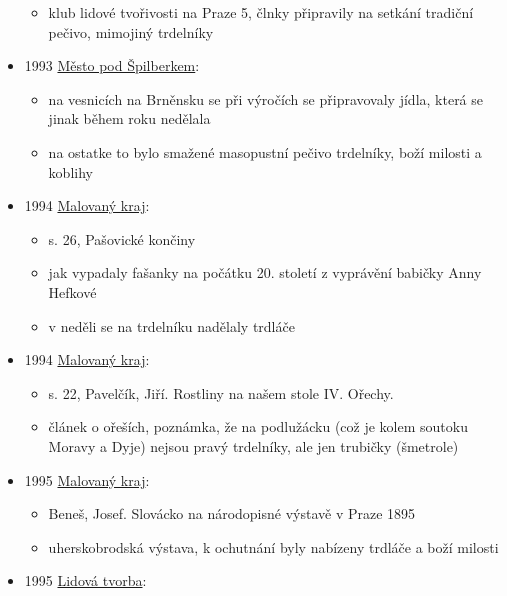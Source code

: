 \begin{itemize}
  \begin{itemize}
  \tightlist
  \item
    klub lidové tvořivosti na Praze 5, člnky připravily na setkání
    tradiční pečivo, mimojiný trdelníky
  \end{itemize}
\item
  1993
  \href{https://ceskadigitalniknihovna.cz/uuid/uuid:f9f63a60-98ab-11e3-8e84-005056827e51}{Město
  pod Špilberkem}:

  \begin{itemize}
  \tightlist
  \item
    na vesnicích na Brněnsku se při výročích se připravovaly jídla,
    která se jinak během roku nedělala
  \item
    na ostatke to bylo smažené masopustní pečivo trdelníky, boží milosti
    a koblihy
  \end{itemize}
\item
  1994
  \href{https://ceskadigitalniknihovna.cz/uuid/uuid:1e8fe7c0-21a7-11e4-a8ab-001018b5eb5c}{Malovaný
  kraj}:

  \begin{itemize}
  \tightlist
  \item
    s. 26, Pašovické končiny
  \item
    jak vypadaly fašanky na počátku 20. století z vyprávění babičky Anny
    Hefkové
  \item
    v neděli se na trdelníku nadělaly trdláče
  \end{itemize}
\item
  1994
  \href{https://ceskadigitalniknihovna.cz/uuid/uuid:464cbdb0-4060-11e4-8f33-5ef3fc9ae867}{Malovaný
  kraj}:

  \begin{itemize}
  \tightlist
  \item
    s. 22, Pavelčík, Jiří. Rostliny na našem stole IV. Ořechy.
  \item
    článek o ořeších, poznámka, že na podlužácku (což je kolem soutoku
    Moravy a Dyje) nejsou pravý trdelníky, ale jen trubičky (šmetrole)
  \end{itemize}
\item
  1995
  \href{https://ceskadigitalniknihovna.cz/uuid/uuid:0f104c60-3fbe-11e4-b6b9-001018b5eb5c}{Malovaný
  kraj}:

  \begin{itemize}
  \tightlist
  \item
    Beneš, Josef. Slovácko na národopisné výstavě v Praze 1895
  \item
    uherskobrodská výstava, k ochutnání byly nabízeny trdláče a boží
    milosti
  \end{itemize}
\item
  1995
  \href{https://ceskadigitalniknihovna.cz/uuid/uuid:3cd53df2-ab22-431c-b169-618cc63f3ce6}{Lidová
  tvorba}:


\end{itemize}
